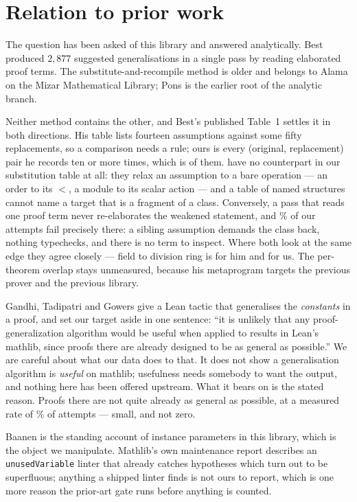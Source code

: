 \documentclass[11pt]{article}
\begin{document}
\section{Relation to prior work}\label{sec:prior}

The question has been asked of this library and answered analytically. Best
\cite{best2021} produced $2{,}877$ suggested generalisations in a single pass by
reading elaborated proof terms. The substitute-and-recompile method is older and
belongs to Alama \cite{alama2013} on the Mizar Mathematical Library; Pons
\cite{pons2002} is the earlier root of the analytic branch.

Neither method contains the other, and Best's published Table~1 settles it in
both directions. His table lists fourteen assumptions against some fifty
replacements, so a comparison needs a rule; ours is every (original,
replacement) pair he records ten or more times, which is \bestTop{} of them.
\bestMissing{} have no counterpart in our substitution table at all: they relax
an assumption to a bare operation --- an order to its \(<\), a module to its
scalar action --- and a table of named structures cannot name a target that is a
fragment of a class. Conversely, a pass that reads one proof term never
re-elaborates the weakened statement, and \incoherentPercent{}\% of our attempts
fail precisely there: a sibling assumption demands the class back, nothing
typechecks, and there is no term to inspect. Where both look at the same edge
they agree closely --- field to division ring is \bestFieldDR{} for him and
\ourFieldDR{} for us. The per-theorem overlap stays unmeasured, because his
metaprogram targets the previous prover and the previous library.

Gandhi, Tadipatri and Gowers \cite{gandhi2025} give a Lean tactic that
generalises the \emph{constants} in a proof, and set our target aside in one
sentence: ``it is unlikely that any proof-generalization algorithm would be
useful when applied to results in Lean's mathlib, since proofs there are already
designed to be as general as possible.'' We are careful about what our data does
to that. It does not show a generalisation algorithm is \emph{useful} on
mathlib; usefulness needs somebody to want the output, and nothing here has been
offered upstream. What it bears on is the stated reason. Proofs there are not
quite already as general as possible, at a measured rate of \ourYield{}\% of
attempts --- small, and not zero.

Baanen \cite{baanen2022} is the standing account of instance parameters in this
library, which is the object we manipulate. Mathlib's own maintenance report
\cite{baanen2025} describes an \texttt{unusedVariable} linter that already
catches hypotheses which turn out to be superfluous; anything a shipped linter
finds is not ours to report, which is one more reason the prior-art gate runs
before anything is counted.
\end{document}
